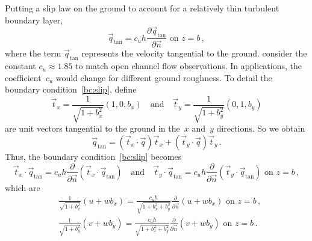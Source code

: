 \documentclass[12pt,a5paper]{article}
\begin{document}
Putting a slip law on the ground to account for a relatively thin turbulent boundary layer, 
\begin{equation}
\vec q_{\text{tan}}=c_uh\frac{\partial\vec q_{\text{tan}}}{\partial\vec n} \text{ on } z=b\,,
\label{bc:slip}
\end{equation} 
where the term $\vec q_{\text{tan}}$ represents the velocity tangential to the ground. 
\cite{Roberts2008} consider the constant $c_u\approx1.85$ to match open channel flow observations. 
In applications, the coefficient~$c_u$ would change for different ground roughness. 
To detail the boundary condition~\eqref{bc:slip}, define
\begin{equation*}
\vec t_x=\frac{1}{\sqrt{1+b_x^2}}(1,0,b_x)
\quad\text{and}\quad
\vec t_y=\frac{1}{\sqrt{1+b_y^2}}(0,1,b_y)
\end{equation*}
are unit vectors tangential to the ground in the~$x$ and~$y$ directions. 
So we obtain
\begin{equation*}
\vec q_{\text{tan}}=(\vec t_x\cdot\vec q)\vec t_x+(\vec t_y\cdot\vec q)\vec t_y\,.
\end{equation*}
Thus, the boundary condition~\eqref{bc:slip} becomes
\begin{equation*}
\vec t_x\cdot\vec q_{\text{tan}}=c_uh\frac{\partial}{\partial\vec n}(\vec t_x\cdot\vec q_{\text{tan}})
\quad\text{and}\quad
\vec t_y\cdot\vec q_{\text{tan}}=c_uh\frac{\partial}{\partial\vec n}(\vec t_y\cdot\vec q_{\text{tan}}) \text{ on } z=b\,,
\end{equation*}
which are
\begin{align}&
\frac{1}{\sqrt{1+b_x^2}}(u+wb_x)=\frac{c_uh}{\sqrt{1+b_x^2+b_y^2}}\frac{\partial}{\partial\vec n}(u+wb_x)\text{ on }z=b\,,\label{slip:u}\\&
\frac{1}{\sqrt{1+b_y^2}}(v+wb_y)=\frac{c_uh}{\sqrt{1+b_x^2+b_y^2}}\frac{\partial}{\partial\vec n}(v+wb_y)\text{ on }z=b\,.\label{slip:v}
\end{align}
\end{document}
